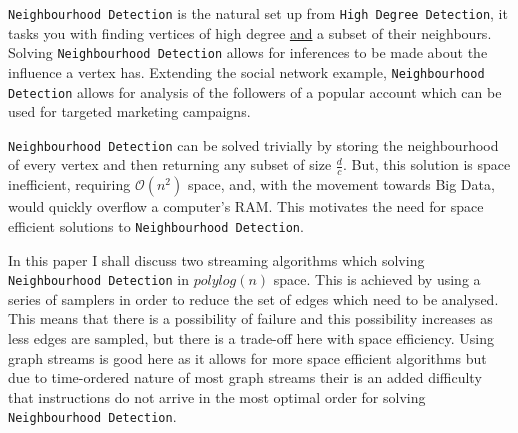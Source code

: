 \documentclass[11pt,twoside,a4paper]{report}
\begin{document}
\vspace{.3cm}\begin{adjustwidth}{.3cm}{}\end{adjustwidth}\vspace{.3cm}

\par\texttt{Neighbourhood Detection} is the natural set up from \texttt{High Degree Detection}, it tasks you with finding vertices of high degree \underline{and} a subset of their neighbours. Solving \texttt{Neighbourhood Detection} allows for inferences to be made about the influence a vertex has. Extending the social network example, \texttt{Neighbourhood Detection} allows for analysis of the followers of a popular account which can be used for targeted marketing campaigns.

\par\texttt{Neighbourhood Detection} can be solved trivially by storing the neighbourhood of every vertex and then returning any subset of size $\frac{d}c$. But, this solution is space inefficient, requiring $\mathcal{O}(n^2)$ space, and, with the movement towards Big Data, would quickly overflow a computer's RAM. This motivates the need for space efficient solutions to \texttt{Neighbourhood Detection}.

\par In this paper I shall discuss two streaming algorithms which solving \texttt{Neighbourhood Detection} in $polylog(n)$ space. This is achieved by using a series of samplers in order to reduce the set of edges which need to be analysed. This means that there is a possibility of failure and this possibility increases as less edges are sampled, but there is a trade-off here with space efficiency.
Using graph streams is good here as it allows for more space efficient algorithms but due to time-ordered nature of most graph streams their is an added difficulty that instructions do not arrive in the most optimal order for solving \texttt{Neighbourhood Detection}.
\end{document}

